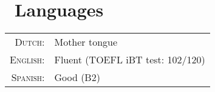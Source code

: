 \section{\faComment\ Languages}
\begin{tabular}{rl}
 \textsc{Dutch:}&Mother tongue\\
\textsc{English:}&Fluent (TOEFL iBT test: 102/120)\\
\textsc{Spanish:}&Good (B2)\\
\end{tabular}